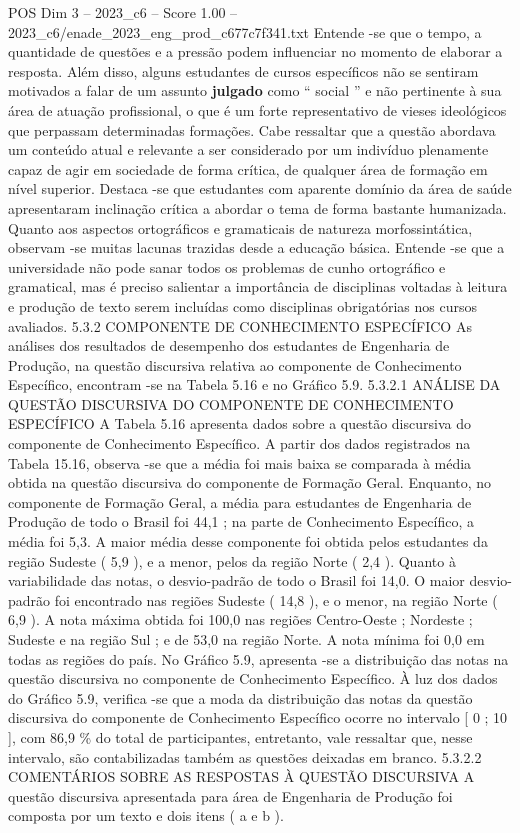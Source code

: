 \begin{textsample}{POS Dim 3 – 2023\_c6 – Score 1.00 – 2023\_c6/enade\_2023\_eng\_prod\_c677c7f341.txt}
Entende -se que o tempo, a quantidade de questões e a pressão podem influenciar no momento de elaborar a resposta.
Além disso, alguns estudantes de cursos específicos não se sentiram motivados a falar de um assunto \textbf{julgado} como “ social ” e não pertinente à sua área de atuação profissional, o que é um forte representativo de vieses ideológicos que perpassam determinadas formações.
Cabe ressaltar que a questão abordava um conteúdo atual e relevante a ser considerado por um indivíduo plenamente capaz de agir em sociedade de forma crítica, de qualquer área de formação em nível superior.
Destaca -se que estudantes com aparente domínio da área de saúde apresentaram inclinação crítica a abordar o tema de forma bastante humanizada.
Quanto aos aspectos ortográficos e gramaticais de natureza morfossintática, observam -se muitas lacunas trazidas desde a educação básica.
Entende -se que a universidade não pode sanar todos os problemas de cunho ortográfico e gramatical, mas é preciso salientar a importância de disciplinas voltadas à leitura e produção de texto serem incluídas como disciplinas obrigatórias nos cursos avaliados. 5.3.2 COMPONENTE DE CONHECIMENTO ESPECÍFICO As análises dos resultados de desempenho dos estudantes de Engenharia de Produção, na questão discursiva relativa ao componente de Conhecimento Específico, encontram -se na Tabela 5.16 e no Gráfico 5.9. 5.3.2.1 ANÁLISE DA QUESTÃO DISCURSIVA DO COMPONENTE DE CONHECIMENTO ESPECÍFICO A Tabela 5.16 apresenta dados sobre a questão discursiva do componente de Conhecimento Específico.
A partir dos dados registrados na Tabela 15.16, observa -se que a média foi mais baixa se comparada à média obtida na questão discursiva do componente de Formação Geral.
Enquanto, no componente de Formação Geral, a média para estudantes de Engenharia de Produção de todo o Brasil foi 44,1 ; na parte de Conhecimento Específico, a média foi 5,3.
A maior média desse componente foi obtida pelos estudantes da região Sudeste ( 5,9 ), e a menor, pelos da região Norte ( 2,4 ).
Quanto à variabilidade das notas, o desvio-padrão de todo o Brasil foi 14,0.
O maior desvio-padrão foi encontrado nas regiões Sudeste ( 14,8 ), e o menor, na região Norte ( 6,9 ).
A nota máxima obtida foi 100,0 nas regiões Centro-Oeste ; Nordeste ; Sudeste e na região Sul ; e de 53,0 na região Norte.
A nota mínima foi 0,0 em todas as regiões do país.
No Gráfico 5.9, apresenta -se a distribuição das notas na questão discursiva no componente de Conhecimento Específico.
À luz dos dados do Gráfico 5.9, verifica -se que a moda da distribuição das notas da questão discursiva do componente de Conhecimento Específico ocorre no intervalo [ 0 ; 10 ], com 86,9 \% do total de participantes, entretanto, vale ressaltar que, nesse intervalo, são contabilizadas também as questões deixadas em branco. 5.3.2.2 COMENTÁRIOS SOBRE AS RESPOSTAS À QUESTÃO DISCURSIVA A questão discursiva apresentada para área de Engenharia de Produção foi composta por um texto e dois itens ( a e b ).

\end{textsample}
